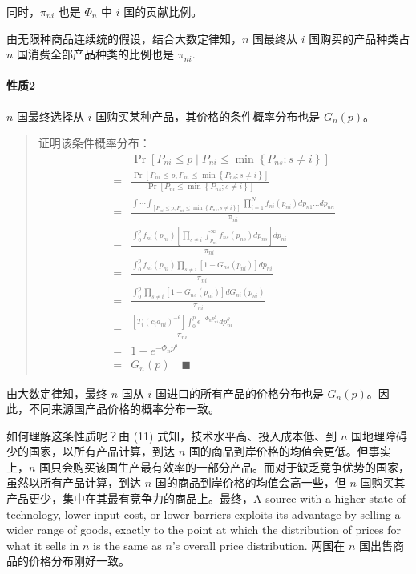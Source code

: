 \documentclass[
]{article}
\begin{document}
同时，\(\pi_{ni}\) 也是 \(\Phi_{n}\) 中 \(i\) 国的贡献比例。

由无限种商品连续统的假设，结合大数定律知，\(n\) 国最终从 \(i\) 国购买的产品种类占
\(n\) 国消费全部产品种类的比例也是 \(\pi_{ni}\).

\hypertarget{ux6027ux8d282}{%
\paragraph{性质2}\label{ux6027ux8d282}}

\(n\) 国最终选择从 \(i\) 国购买某种产品，其价格的条件概率分布也是 \(G_{n}(p)\)。

\begin{quote}
证明该条件概率分布：\[
\begin{aligned}
& \operatorname{Pr}\left[ P_{n i} \leq p \mid P_{n i} \leq \min \left\{P_{n s}; s \neq i\right\}\right] \\ 
=& \frac{\operatorname{Pr}\left[P_{n i} \leq p, P_{n i} \leq \min \left\{P_{n s}; s \neq i\right\}\right]}{\operatorname{Pr}\left[P_{n i} \leq \min \left\{P_{n s}; s \neq i\right\}\right]}\\ 
=& \frac{\int \cdots \int_{\left[P_{n i} \leq p, P_{n i} \leq \min \left\{P_{n s}; s \neq i\right\}\right]} \prod_{i = 1}^{N} f_{n i}\left(p_{n i}\right) d p_{n 1} \ldots d p_{n n}}{\pi_{n i}}\\ 
=& \frac{\int_{0}^{p} f_{n i}\left(p_{n i}\right)\left[\prod_{s \neq i} \int_{p_{n i}}^{\infty} f_{n s}\left(p_{n s}\right) d p_{n s}\right] d p_{n i}}{\pi_{n i}}\\ 
=& \frac{\int_{0}^{p} f_{n i}\left(p_{n i}\right) \prod_{s \neq i}\left[1-G_{n s}\left(p_{n i}\right)\right] d p_{n i}}{\pi_{n i}}\\ 
=& \frac{\int_{0}^{p} \prod_{s \neq i}\left[1-G_{n s}\left(p_{n i}\right)\right] d G_{n i}\left(p_{n i}\right)}{\pi_{n i}}\\
=& \frac{\left[T_{i}\left(c_{i} d_{n i}\right)^{-\theta}\right]\int_{0}^{p} e^{-\Phi_{n} p_{n i}^{\theta}} d p_{n i}^{\theta}}{\pi_{n i}}\\ 
=& 1-e^{-\Phi_{n} p^{\theta}} \\
=& G_n(p) \quad \blacksquare 
\end{aligned}\]
\end{quote}

由大数定律知，最终 \(n\) 国从 \(i\) 国进口的所有产品的价格分布也是
\(G_{n}(p)\)。因此，不同来源国产品价格的概率分布一致。

如何理解这条性质呢？由 (11) 式知，技术水平高、投入成本低、到 \(n\)
国地理障碍少的国家，以所有产品计算，到达 \(n\)
国的商品到岸价格的均值会更低。但事实上，\(n\)
国只会购买该国生产最有效率的一部分产品。而对于缺乏竞争优势的国家，虽然以所有产品计算，到达
\(n\) 国的商品到岸价格的均值会高一些，但 \(n\)
国购买其产品更少，集中在其最有竞争力的商品上。最终，A source with a higher state
of technology, lower input cost, or lower barriers exploits its advantage by
selling a wider range of goods, exactly to the point at which the distribution
of prices for what it sells in \(n\) is the same as \(n\)'s overall price
distribution. 两国在 \(n\) 国出售商品的价格分布刚好一致。
\end{document}
